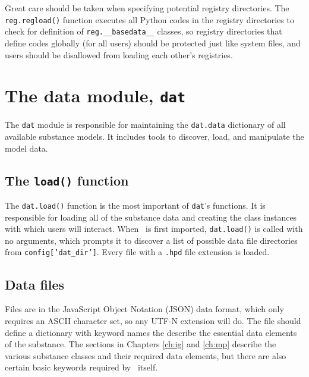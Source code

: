 Great care should be taken when specifying potential registry directories.  The \texttt{reg.regload()} function executes all Python codes in the registry directories to check for definition of \verb|reg.__basedata__| classes, so registry directories that define codes globally (for all users) should be protected just like system files, and users should be disallowed from loading each other's registries.

\section{The data module, \texttt{dat}}

The \texttt{dat} module is responsible for maintaining the \texttt{dat.data} dictionary of all available substance models.  It includes tools to discover, load, and manipulate the model data.

\subsection{The \texttt{load()} function}\label{sec:dat:load}

The \texttt{dat.load()} function is the most important of \texttt{dat}'s functions.  It is responsible for loading all of the substance data and creating the class instances with which users will interact.  When \PM\ is first imported, \texttt{dat.load()} is called with no arguments, which prompts it to discover a list of possible data file directories from \texttt{config['dat_dir']}.  Every file with a \texttt{.hpd} file extension is loaded.

\subsection{Data files}\label{sec:dat:hpd}

Files are in the JavaScript Object Notation (JSON) data format, which only requires an ASCII character set, so any UTF-N extension will do.  The file should define a dictionary with keyword names the describe the essential data elements of the substance.  The sections in Chapters \ref{ch:ig} and \ref{ch:mp} describe the various substance classes and their required data elements, but there are also certain basic keywords required by \PM\ itself.

